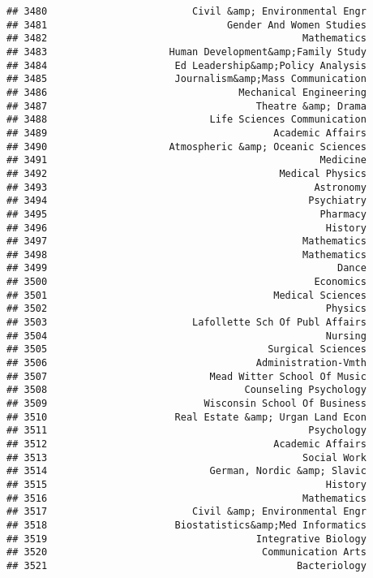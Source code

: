 \documentclass[
]{article}
\begin{document}
\begin{verbatim}
## 3480                         Civil &amp; Environmental Engr
## 3481                               Gender And Women Studies
## 3482                                            Mathematics
## 3483                     Human Development&amp;Family Study
## 3484                      Ed Leadership&amp;Policy Analysis
## 3485                      Journalism&amp;Mass Communication
## 3486                                 Mechanical Engineering
## 3487                                    Theatre &amp; Drama
## 3488                            Life Sciences Communication
## 3489                                       Academic Affairs
## 3490                     Atmospheric &amp; Oceanic Sciences
## 3491                                               Medicine
## 3492                                        Medical Physics
## 3493                                              Astronomy
## 3494                                             Psychiatry
## 3495                                               Pharmacy
## 3496                                                History
## 3497                                            Mathematics
## 3498                                            Mathematics
## 3499                                                  Dance
## 3500                                              Economics
## 3501                                       Medical Sciences
## 3502                                                Physics
## 3503                         Lafollette Sch Of Publ Affairs
## 3504                                                Nursing
## 3505                                      Surgical Sciences
## 3506                                    Administration-Vmth
## 3507                            Mead Witter School Of Music
## 3508                                  Counseling Psychology
## 3509                           Wisconsin School Of Business
## 3510                      Real Estate &amp; Urgan Land Econ
## 3511                                             Psychology
## 3512                                       Academic Affairs
## 3513                                            Social Work
## 3514                            German, Nordic &amp; Slavic
## 3515                                                History
## 3516                                            Mathematics
## 3517                         Civil &amp; Environmental Engr
## 3518                      Biostatistics&amp;Med Informatics
## 3519                                    Integrative Biology
## 3520                                     Communication Arts
## 3521                                           Bacteriology

\end{verbatim}
\end{document}
